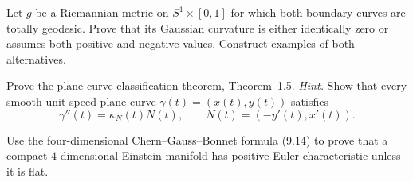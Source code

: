 \begin{exercise}
\label{prob:cylinder-metric-gaussian-curvature}

Let $g$ be a Riemannian metric on $S^1\times[0,1]$ for which both boundary
curves are totally geodesic. Prove that its Gaussian curvature is either
identically zero or assumes both positive and negative values. Construct
examples of both alternatives.
\end{exercise}

\begin{exercise}
\label{prob:plane-curve-classification}

Prove the plane-curve classification theorem, Theorem~1.5.
\emph{Hint.} Show that every smooth unit-speed plane curve
$\gamma(t)=(x(t),y(t))$ satisfies
\[
\gamma''(t)=\kappa_N(t)N(t),
\qquad
N(t)=(-y'(t),x'(t)).
\]
\end{exercise}

\begin{exercise}
\label{prob:einstein-manifold-euler-characteristic}

Use the four-dimensional Chern--Gauss--Bonnet formula (9.14) to prove that a
compact $4$-dimensional Einstein manifold has positive Euler characteristic
unless it is flat.
\end{exercise}
